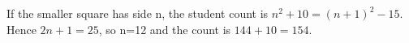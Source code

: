 If the smaller square has side n, the student count is $n^2+10=(n+1)^2-15$. Hence $2n+1=25$, so n=12 and the count is $144+10=\boxed{154}$.
